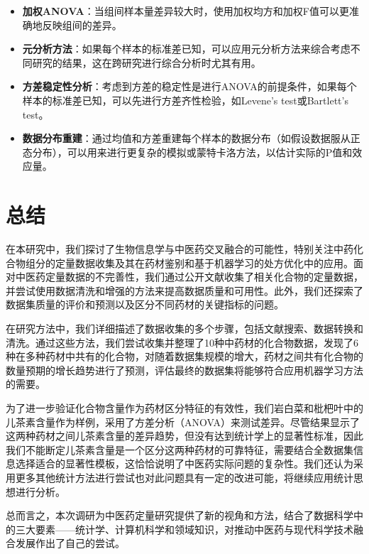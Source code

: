\begin{itemize}
\item   \textbf{加权ANOVA}：当组间样本量差异较大时，使用加权均方和加权F值可以更准确地反映组间的差异。
\item   \textbf{元分析方法}：如果每个样本的标准差已知，可以应用元分析方法来综合考虑不同研究的结果，这在跨研究进行综合分析时尤其有用。
\item   \textbf{方差稳定性分析}：考虑到方差的稳定性是进行ANOVA的前提条件，如果每个样本的标准差已知，可以先进行方差齐性检验，如Levene's test或Bartlett's test。
\item   \textbf{数据分布重建}：通过均值和方差重建每个样本的数据分布（如假设数据服从正态分布），可以用来进行更复杂的模拟或蒙特卡洛方法，以估计实际的P值和效应量。
\end{itemize}

\section{总结}
在本研究中，我们探讨了生物信息学与中医药交叉融合的可能性，特别关注中药化合物组分的定量数据收集及其在药材鉴别和基于机器学习的处方优化中的应用。面对中医药定量数据的不完善性，我们通过公开文献收集了相关化合物的定量数据，并尝试使用数据清洗和增强的方法来提高数据质量和可用性。此外，我们还探索了数据集质量的评价和预测以及区分不同药材的关键指标的问题。

在研究方法中，我们详细描述了数据收集的多个步骤，包括文献搜索、数据转换和清洗。通过这些方法，我们尝试收集并整理了10种中药材的化合物数据，发现了6种在多种药材中共有的化合物，对随着数据集规模的增大，药材之间共有化合物的数量预期的增长趋势进行了预测，评估最终的数据集将能够符合应用机器学习方法的需要。

为了进一步验证化合物含量作为药材区分特征的有效性，我们岩白菜和枇杷叶中的儿茶素含量作为样例，采用了方差分析（ANOVA）来测试差异。尽管结果显示了这两种药材之间儿茶素含量的差异趋势，但没有达到统计学上的显著性标准，因此我们不能断定儿茶素含量是一个区分这两种药材的可靠特征，需要结合全数据集信息选择适合的显著性模板，这恰恰说明了中医药实际问题的复杂性。我们还认为采用更多其他统计方法进行尝试也对此问题具有一定的改进可能，将继续应用统计思想进行分析。

总而言之，本次调研为中医药定量研究提供了新的视角和方法，结合了数据科学中的三大要素——统计学、计算机科学和领域知识，对推动中医药与现代科学技术融合发展作出了自己的尝试。
